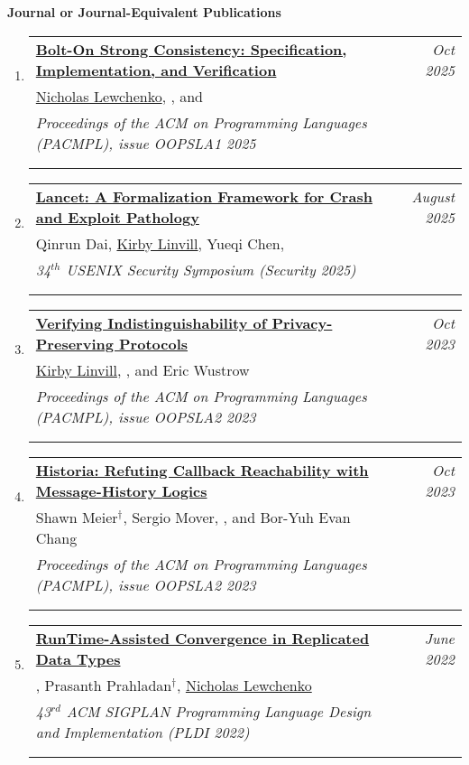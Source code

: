 \documentclass{article}
\makeatletter
\newenvironment{benumerate}[2]{
    \let\oldItem\item
    \def\item{\addtocounter{enumi}{-2}\oldItem}
    \begin{enumerate}[#2] \itemsep3pt
    \setcounter{enumi}{#1}
    \addtocounter{enumi}{1}}
  {\end{enumerate}}
\newenvironment{region}[3]{%
  {{\textbf{#1}}}
  \begin{benumerate}{#3}{\color{RoyalBlue}#2}}
  {\end{benumerate}\vspace{0.8ex}}
\newenvironment{publication}[6]
{ \item
  \begin{tabular*}{6.8in}{p{6in}@{\extracolsep{\fill}}r}
    \href{#1}{\textbf{#2}} & \textit{#3}\\ #4 &\\ \textit{#5}&\\
    \ifthenelse{\equal{#6}{}}{}{#6&\\}
  \end{tabular*}
} {}
\makeatother
\begin{document}
\begin{region} {Journal or Journal-Equivalent Publications}{{J}1}{7}

\begin{publication}{https://dl.acm.org/doi/10.1145/3720502}
		{Bolt-On Strong Consistency: Specification, Implementation, and Verification}
    {Oct 2025}{\underline{Nicholas Lewchenko}, \ugkaki, and \bec}
    {Proceedings of the ACM on Programming Languages (PACMPL), issue OOPSLA1
    2025}
    {Article No.: 137; Pages: 1604 - 1631; Acceptance rate: 32\%}
\end{publication}

\begin{publication} {https://www.usenix.org/conference/usenixsecurity25/presentation/dai}
		{Lancet: A Formalization Framework for Crash and Exploit Pathology}
		{August 2025} {Qinrun Dai, \underline{Kirby Linvill}, Yueqi Chen, \ugkaki}
		{34$^{th}$ USENIX Security Symposium (Security 2025)}
    {Pages 375 - 394 (double column); Accceptance rate: 17\%}
\end{publication}

\begin{publication}{https://gowthamk.github.io/docs/oopsla23a.pdf}
		{Verifying Indistinguishability of Privacy-Preserving Protocols } {Oct
    2023}{\underline{Kirby Linvill}, \ugkaki, and Eric Wustrow}
    {Proceedings of the ACM on Programming Languages (PACMPL), issue
    OOPSLA2 2023} 
    {Article No.: 273; Pages 1442 - 1469; Acceptance rate: 38\%}
\end{publication}

\begin{publication}{https://gowthamk.github.io/docs/oopsla23b.pdf}
		{Historia: Refuting Callback Reachability with Message-History Logics}
    {Oct 2023}{Shawn Meier$^\dag$, Sergio Mover, \ugkaki, and Bor-Yuh Evan Chang}
    {Proceedings of the ACM on Programming Languages (PACMPL), issue OOPSLA2
    2023}
    {Article No.: 289; Pages 1905 - 1934; Acceptance rate: 38\%}
\end{publication}

\begin{publication} {https://gowthamk.github.io/docs/pldi22.pdf}
  {RunTime-Assisted Convergence in Replicated Data Types}
  {June 2022} {\ugkaki, Prasanth Prahladan$^\dag$, \underline{Nicholas Lewchenko}}
  {43$^{rd}$ ACM SIGPLAN Programming Language Design and
  Implementation (PLDI 2022)}
  {Pages 364 - 378 (double column); Accceptance rate: 20\%}
\end{publication}



\end{region}
\end{document}

